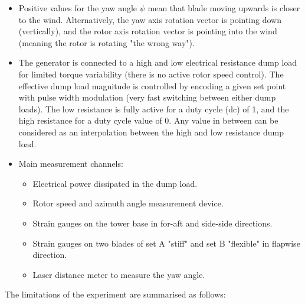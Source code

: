 \documentclass[a4paper]{jpconf}
\begin{document}
\begin{itemize}
	\item Positive values for the yaw angle $\psi$ mean that blade moving upwards is closer to the wind. Alternatively, the yaw axis rotation vector is pointing down (vertically), and the rotor axis rotation vector is pointing into the wind (meaning the rotor is rotating "the wrong way").
	\item The generator is connected to a high and low electrical resistance dump load for limited torque variability (there is no active rotor speed control). The effective dump load magnitude is controlled by encoding a given set point with pulse width modulation (very fast switching between either dump loads). The low resistance is fully active for a duty cycle (dc) of 1, and the high resistance for a duty cycle value of 0. Any value in between can be considered as an interpolation between the high and low resistance dump load.
	\item Main measurement channels:
	\begin{itemize}
		\item Electrical power dissipated in the dump load.	
		\item Rotor speed and azimuth angle measurement device.
		\item Strain gauges on the tower base in for-aft and side-side directions.
		\item Strain gauges on two blades of set A "stiff" and set B "flexible" in flapwise direction.
		\item Laser distance meter to measure the yaw angle.
	\end{itemize}
\end{itemize}

The limitations of the experiment are summarised as follows:
\end{document}
